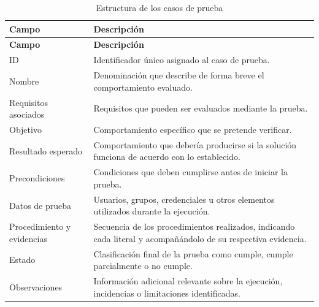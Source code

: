 \begin{longtable}{|
	>{\raggedright\arraybackslash}p{4.0cm}|
	>{\raggedright\arraybackslash}p{9.5cm}|}

	\caption{Estructura de los casos de prueba}
	\label{tab:estructura-casos-prueba}
	\\
	\hline
	\rowcolor[gray]{0.85}
	\textbf{Campo}             &
	\textbf{Descripción}
	\\
	\hline
	\endfirsthead

	\hline
	\rowcolor[gray]{0.85}
	\textbf{Campo}             &
	\textbf{Descripción}
	\\
	\hline
	\endhead

	ID                         & Identificador único asignado al caso de prueba.                                                                \\ \hline
	Nombre                     & Denominación que describe de forma breve el comportamiento evaluado.                                           \\ \hline
	Requisitos asociados       & Requisitos que pueden ser evaluados mediante la prueba.                                                        \\ \hline
	Objetivo                   & Comportamiento específico que se pretende verificar.                                                           \\ \hline
	Resultado esperado         & Comportamiento que debería producirse si la solución funciona de acuerdo con lo establecido.                   \\ \hline
	Precondiciones             & Condiciones que deben cumplirse antes de iniciar la prueba.                                                    \\ \hline
	Datos de prueba            & Usuarios, grupos, credenciales u otros elementos utilizados durante la ejecución.                              \\ \hline
	Procedimiento y evidencias & Secuencia de los procedimientos realizados, indicando cada literal y acompañándolo de su respectiva evidencia. \\ \hline
	Estado                     & Clasificación final de la prueba como cumple, cumple parcialmente o no cumple.                                 \\ \hline
	Observaciones              & Información adicional relevante sobre la ejecución, incidencias o limitaciones identificadas.                  \\ \hline
\end{longtable}
\endgroup
\normalsize

